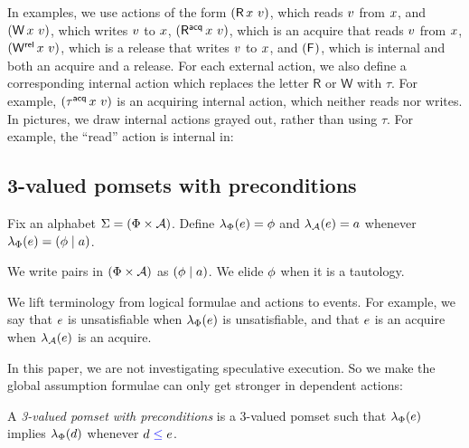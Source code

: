 In examples, we use actions of the form $(\DR{\aLoc}{\aVal})$, which reads
$v$ from $x$, and $(\DW{\aLoc}{\aVal})$, which writes $v$ to
$x$, $(\DRAcq{\aLoc}{\aVal})$, which is an acquire that reads $v$
from $x$, $(\DWRel{\aLoc}{\aVal})$, which is a release that writes
$v$ to $x$, and $(\mathsf{F}_{})$, which is internal and both an acquire and
a release.  For each external action, we also define a corresponding internal
action which replaces the letter $\mathsf{R}$ or $\mathsf{W}$ with $\tau$.
For example, $(\iDRAcq{\aLoc}{\aVal})$ is an acquiring internal action, which
neither reads nor writes. In pictures, we draw internal actions grayed out,
rather than using $\tau$.  For example, the ``read'' action is internal in:
\begin{tikzdisplay}[node distance=1em]
\end{tikzdisplay}



\subsection{3-valued pomsets with preconditions}

Fix an alphabet $\Sigma=(\Phi\times\mathcal{A})$.
Define %
$\lambda_{\Phi}(e)=\phi$ and $\lambda_{\mathcal{A}}(e)=a$ whenever
$\lambda_{\Phi}(e)=(\phi\mid a)$.

We write pairs in $(\Phi\times\mathcal{A})$ as $(\phi \mid a)$.  We elide
$\phi$ when it is a tautology.

We lift terminology from logical formulae and actions to events. For example,
we say that $e$ is unsatisfiable when $\lambda_{\Phi}(e)$ is unsatisfiable,
and that $e$ is an acquire when $\lambda_{\mathcal{A}}(e)$ is an acquire.


In this paper, we are not investigating speculative execution.  So we make
the global assumption formulae can only get stronger in dependent actions:

\begin{definition}
  A \emph{3-valued pomset with preconditions} is a 3-valued pomset such
  that $\lambda_{\Phi}(e)$ implies $\lambda_{\Phi}(d)$ whenever
  $d\mathrel{{\color{blue}\leq}}e$.
\end{definition}

